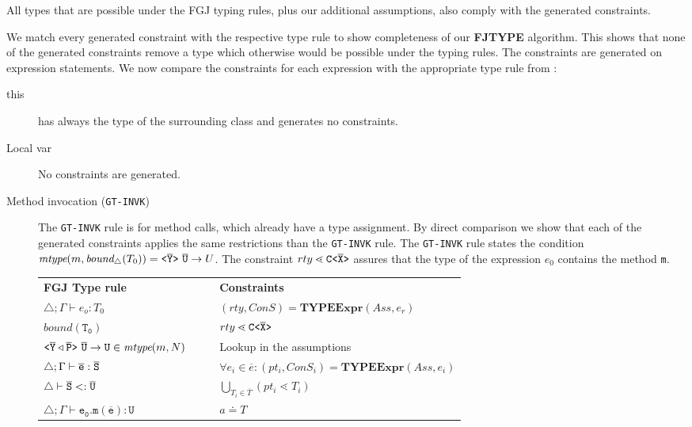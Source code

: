 \documentclass[a4paper,USenglish,cleveref, autoref, thm-restate]{lipics-v2021}
\begin{document}
All types that are possible under the FGJ typing rules, plus our additional assumptions,
also comply with the generated constraints.

We match every generated constraint with the respective type rule to show completeness of our \textbf{FJTYPE} algorithm.
This shows that none of the generated constraints remove a type which otherwise would be possible under the \TFGJ typing rules.
The constraints are generated on expression statements.
We now compare the constraints for each expression with the appropriate type rule from \TFGJ:
\begin{description}
  \item [this]
  has always the type of the surrounding class and generates no constraints.
  \item [Local var]
  No constraints are generated.
  \item[Method invocation (\texttt{GT-INVK})]
The \texttt{GT-INVK} rule is for method calls, which already have a type assignment.
By direct comparison we show that each of the generated constraints applies the same restrictions than the \texttt{GT-INVK} rule.
The \texttt{GT-INVK} rule states the condition $\textit{mtype}(m, \textit{bound}_\triangle(T_0)) = \mathtt{ \texttt{<} \overline{\tt Y} \texttt{>} }\ \overline{\tt U} \to U$.
The constraint $rty \lessdot \mathtt{C \texttt{<} \overline{\tt X} \texttt{>} }$ assures that the type of the expression $e_0$ contains the method \texttt{m}.

\begin{small}
\begin{tabularx}{\linewidth}{lX|Xl}
  \textbf{FGJ Type rule} &&& \textbf{Constraints} \\
  $\triangle; \Gamma \vdash e_o : T_0$ &&& $(rty, ConS) = \textbf{TYPEExpr}(Ass, e_r)$\\ 
  $\mathtt{\textit{bound}(T_0)}$ &&& $rty \lessdot \mathtt{C \texttt{<} \overline{\tt X} \texttt{>} }$ \\
  $\mathtt{\exptype{}{\ol{Y} \triangleleft \ol{P}}\ \ol{U} \to U} \in \textit{mtype}(m, N)$ &&& Lookup in the assumptions \\
 $\triangle; \Gamma \vdash \overline{\tt e} : \overline{\tt S}$ &&& $\forall e_i \in \overline{e} : (pt_i, ConS_i) = \textbf{TYPEExpr}(Ass, e_i)$\\
 $\triangle \vdash \overline{\tt S} <: \overline{\tt U}$ &&& $ \bigcup_{T_i \in \overline{T}} (pt_i \lessdot T_i)$\\
 $\triangle; \Gamma \vdash \mathtt{e_0.m(\overline{e}) : U }$ &&& $a \doteq T$ \\
\end{tabularx}
\end{small}


\end{description}
\end{document}
